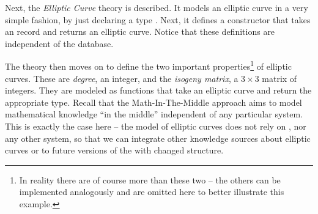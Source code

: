

Next, the \textit{Elliptic Curve} theory is described. 
It models an elliptic curve in a very simple fashion, by just declaring a type . 
Next, it defines a  constructor that takes an \mmt record and returns an elliptic curve. 
Notice that these definitions are independent of the \lmfdb database. 

The theory then moves on to define the two important properties\footnote{In reality there
  are of course more than these two -- the others can be implemented analogously and are
  omitted here to better illustrate this example.} of elliptic curves.  These are
\textit{degree}, an integer, and the \textit{isogeny matrix}, a $3 \times 3$ matrix of
integers. They are modeled as functions that take an elliptic curve and return the
appropriate type.  Recall that the Math-In-The-Middle approach aims to model mathematical
knowledge ``in the middle'' independent of any particular system.  This is exactly the
case here -- the model of elliptic curves does not rely on \lmfdb, nor any other system,
so that we can integrate other knowledge sources about elliptic curves or to future
versions of the \lmfdb with changed structure.


